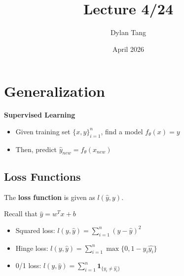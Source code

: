 \documentclass{article}
\title{Lecture 4/24}
\author{Dylan Tang}
\date{April 2026}
\begin{document}
\maketitle

\section{Generalization}
\textbf{Supervised Learning}
\begin{itemize}
    \item Given training set $\{x,y\}_{i=1}^n$, find a model $f_\theta(x) = y$
    \item Then, predict $\hat{y}_{new} = f_\theta(x_{new})$
\end{itemize}

\subsection{Loss Functions}
The \textbf{loss function} is given as $l(\hat{y}, y)$. 

Recall that $\hat{y} = w^Tx+b$

\begin{itemize}
    \item Squared loss: $l(y, \hat{y}) = \sum_{i = 1}^n (y - \hat{y})^2$
    \item Hinge loss: $l(y, \hat{y}) = \sum_{i=1}^n\max\{0, 1 - y_i\hat{y_i}\}$
    \item 0/1 loss: $l(y, \hat{y}) = \sum_{i=1}^n \mathbf{1}_{\{y_i \neq \hat{y_i}\}}$
\end{itemize}
\end{document}
